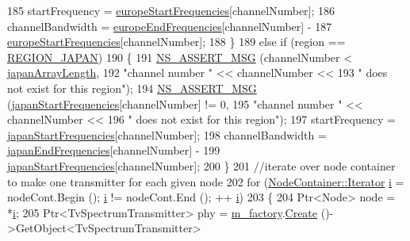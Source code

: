\begin{DoxyCode}
185       startFrequency = \hyperlink{namespacens3_aa7262dcdf15461a937bb8d2afa65288c}{europeStartFrequencies}[channelNumber];    
186       channelBandwidth = \hyperlink{namespacens3_a6c355aa904ccf868b6609c0ef6221787}{europeEndFrequencies}[channelNumber] - 
187                          \hyperlink{namespacens3_aa7262dcdf15461a937bb8d2afa65288c}{europeStartFrequencies}[channelNumber];
188     \}
189   \textcolor{keywordflow}{else} \textcolor{keywordflow}{if} (region == \hyperlink{classns3_1_1TvSpectrumTransmitterHelper_a7b4aafcd25156458e9ec922587169bbeaa08d9e0f51ad5b6a6230db87ed8b2176}{REGION\_JAPAN})
190     \{
191       \hyperlink{assert_8h_aff5ece9066c74e681e74999856f08539}{NS\_ASSERT\_MSG} (channelNumber < \hyperlink{namespacens3_a156aac120ce816da1808c0b1a6bd2a01}{japanArrayLength},
192                      \textcolor{stringliteral}{"channel number "} << channelNumber <<
193                      \textcolor{stringliteral}{" does not exist for this region"});
194       \hyperlink{assert_8h_aff5ece9066c74e681e74999856f08539}{NS\_ASSERT\_MSG} (\hyperlink{namespacens3_a88b726d85e0f1f604a83f713b8e06105}{japanStartFrequencies}[channelNumber] != 0,
195                      \textcolor{stringliteral}{"channel number "} << channelNumber <<
196                      \textcolor{stringliteral}{" does not exist for this region"});
197       startFrequency = \hyperlink{namespacens3_a88b726d85e0f1f604a83f713b8e06105}{japanStartFrequencies}[channelNumber];    
198       channelBandwidth = \hyperlink{namespacens3_aa98ca716c08dfdb6a374ee8d09d18119}{japanEndFrequencies}[channelNumber] - 
199                          \hyperlink{namespacens3_a88b726d85e0f1f604a83f713b8e06105}{japanStartFrequencies}[channelNumber];
200     \}
201   \textcolor{comment}{//iterate over node container to make one transmitter for each given node}
202   \textcolor{keywordflow}{for} (\hyperlink{classns3_1_1NodeContainer_aa1a9f2d2b09bfef7d066d3974bca2cc4}{NodeContainer::Iterator} \hyperlink{bernuolliDistribution_8m_a6f6ccfcf58b31cb6412107d9d5281426}{i} = nodeCont.Begin (); \hyperlink{bernuolliDistribution_8m_a6f6ccfcf58b31cb6412107d9d5281426}{i} != nodeCont.End (); ++
      \hyperlink{bernuolliDistribution_8m_a6f6ccfcf58b31cb6412107d9d5281426}{i})
203     \{
204       Ptr<Node> node = *\hyperlink{bernuolliDistribution_8m_a6f6ccfcf58b31cb6412107d9d5281426}{i};
205       Ptr<TvSpectrumTransmitter> phy = \hyperlink{classns3_1_1TvSpectrumTransmitterHelper_ae89194664bc52ed899f7dd0d074e588c}{m\_factory}.\hyperlink{classns3_1_1ObjectFactory_a18152e93f0a6fe184ed7300cb31e9896}{Create} ()->GetObject<TvSpectrumTransmitter>

\end{DoxyCode}
